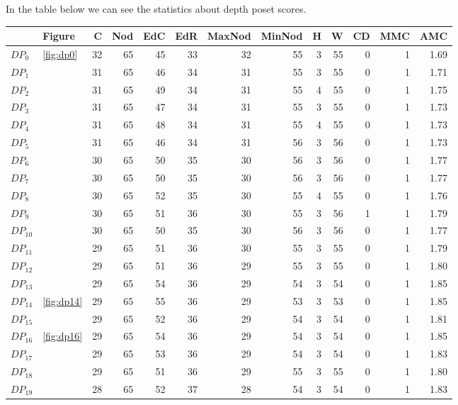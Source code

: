 \documentclass{article}
\begin{document}
\par In the table below we can see the statistics about depth poset scores.
\begin{center}
\begin{tabular}{llrrrrrrrrrrr}
\toprule
 & Figure & C & Nod & EdC & EdR & MaxNod & MinNod & H & W & CD & MMC & AMC \\
\midrule
$DP_{0}$ & \ref{fig:dp0} & 32 & 65 & 45 & 33 & 32 & 55 & 3 & 55 & 0 & 1 & 1.69 \\
$DP_{1}$ &  & 31 & 65 & 46 & 34 & 31 & 55 & 3 & 55 & 0 & 1 & 1.71 \\
$DP_{2}$ &  & 31 & 65 & 49 & 34 & 31 & 55 & 4 & 55 & 0 & 1 & 1.75 \\
$DP_{3}$ &  & 31 & 65 & 47 & 34 & 31 & 55 & 3 & 55 & 0 & 1 & 1.73 \\
$DP_{4}$ &  & 31 & 65 & 48 & 34 & 31 & 55 & 4 & 55 & 0 & 1 & 1.73 \\
$DP_{5}$ &  & 31 & 65 & 46 & 34 & 31 & 56 & 3 & 56 & 0 & 1 & 1.73 \\
$DP_{6}$ &  & 30 & 65 & 50 & 35 & 30 & 56 & 3 & 56 & 0 & 1 & 1.77 \\
$DP_{7}$ &  & 30 & 65 & 50 & 35 & 30 & 56 & 3 & 56 & 0 & 1 & 1.77 \\
$DP_{8}$ &  & 30 & 65 & 52 & 35 & 30 & 55 & 4 & 55 & 0 & 1 & 1.76 \\
$DP_{9}$ &  & 30 & 65 & 51 & 36 & 30 & 55 & 3 & 56 & 1 & 1 & 1.79 \\
$DP_{10}$ &  & 30 & 65 & 50 & 35 & 30 & 56 & 3 & 56 & 0 & 1 & 1.77 \\
$DP_{11}$ &  & 29 & 65 & 51 & 36 & 30 & 55 & 3 & 55 & 0 & 1 & 1.79 \\
$DP_{12}$ &  & 29 & 65 & 51 & 36 & 29 & 55 & 3 & 55 & 0 & 1 & 1.80 \\
$DP_{13}$ &  & 29 & 65 & 54 & 36 & 29 & 54 & 3 & 54 & 0 & 1 & 1.85 \\
$DP_{14}$ & \ref{fig:dp14} & 29 & 65 & 55 & 36 & 29 & 53 & 3 & 53 & 0 & 1 & 1.85 \\
$DP_{15}$ &  & 29 & 65 & 52 & 36 & 29 & 54 & 3 & 54 & 0 & 1 & 1.81 \\
$DP_{16}$ & \ref{fig:dp16} & 29 & 65 & 54 & 36 & 29 & 54 & 3 & 54 & 0 & 1 & 1.85 \\
$DP_{17}$ &  & 29 & 65 & 53 & 36 & 29 & 54 & 3 & 54 & 0 & 1 & 1.83 \\
$DP_{18}$ &  & 29 & 65 & 51 & 36 & 29 & 55 & 3 & 55 & 0 & 1 & 1.80 \\
$DP_{19}$ &  & 28 & 65 & 52 & 37 & 28 & 54 & 3 & 54 & 0 & 1 & 1.83 \\
\bottomrule
\end{tabular}


\end{center}
\end{document}
